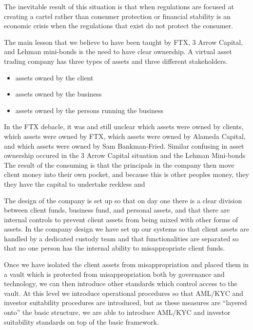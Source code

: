 The inevitable result of this situation is that when regulations are
focused at creating a cartel rather than consumer protection or
financial stability is an economic crisis when the regulations that
exist do not protect the consumer.

The main lesson that we believe to have been taught by FTX, 3 Arrow
Capital, and Lehman mini-bonds is the need to have clear ownership.  A
virtual asset trading company has three types of assets and three 
different stakeholders.

\begin{itemize}
\item assets owned by the client
\item assets owned by the business
\item assets owned by the persons running the business
\end{itemize}

In the FTX debacle, it was and still unclear which assets were owned
by clients, which assets were owned by FTX, which assets were owned by
Alameda Capital, and which assets were owned by Sam Bankman-Fried.
Similar confusing in asset ownership occured in the 3 Arrow Capital
situation and the Lehman Mini-bonds   The result of the consuming is
that the principals in the company then move client money into their
own pocket, and because this is other peoples money, they they have
the capital to undertake reckless and 

The design of the company is set up so that on day one there is a
clear division between client funds, business fund, and personal
assets, and that there are internal controls to prevent client assets
from being mixed with other forms of assets.  In the company design we
have set up our systems so that client assets are handled by a
dedicated custody team and that functionalities are separated so that
no one person has the internal ability to misappropriate client funds.

Once we have isolated the client assets from misappropriation and
placed them in a vault which is protected from misappropriation both
by governance and technology, we can then introduce other standards
which control access to the vault.  At this level we introduce
operational procedures so that AML/KYC and investor suitability
procedures are introduced, but as these measures are ``layered onto''
the basic structure, we are able to introduce AML/KYC and investor
suitability standards on top of the basic framework.



